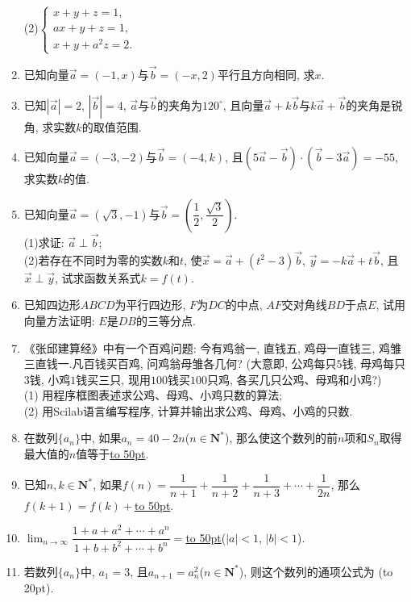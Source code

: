 \documentclass[10pt,a4paper]{article}
\newcommand{\blank}[1]{\underline{\hbox to #1pt{}}}
\newcommand{\bracket}[1]{(\hbox to #1pt{})}
\begin{document}
\begin{enumerate}[1.]
(2)$\begin{cases}x+y+z=1,  \\ax+y+z=1,  \\x+y+a^2z=2.  \end{cases}$
\item 已知向量$\overrightarrow a=(-1,x)$与$\overrightarrow b=(-x,2)$平行且方向相同, 求$x$.
\item 已知$|\overrightarrow a|=2$, $|\overrightarrow b|=4$, $\overrightarrow a$与$\overrightarrow b$的夹角为$120^{\circ }$, 且向量$\overrightarrow a+k\overrightarrow b$与$k\overrightarrow a+\overrightarrow b$的夹角是锐角, 求实数$k$的取值范围.
\item 已知向量$\overrightarrow a=(-3,-2)$与$\overrightarrow b=(-4,k)$, 且$(5\overrightarrow a-\overrightarrow b)\cdot (\overrightarrow b-3\overrightarrow a)=-55$, 求实数$k$的值.
\item 已知向量$\overrightarrow a=(\sqrt 3,-1)$与$\overrightarrow b=(\dfrac 12,\dfrac{\sqrt 3}2)$.\\
(1)求证: $\overrightarrow a\perp \overrightarrow b$;\\
(2)若存在不同时为零的实数$k$和$t$, 使$\overrightarrow x=\overrightarrow a+(t^2-3)\overrightarrow b$, $\overrightarrow y=-k\overrightarrow a+t\overrightarrow b$, 且$\overrightarrow x\perp \overrightarrow y$, 试求函数关系式$k=f(t)$.
\item 已知四边形$ABCD$为平行四边形, $F$为$DC$的中点, $AF$交对角线$BD$于点$E$, 试用向量方法证明: $E$是$DB$的三等分点.
\item 《张邱建算经》中有一个百鸡问题: 今有鸡翁一, 直钱五, 鸡母一直钱三, 鸡雏三直钱一.凡百钱买百鸡, 问鸡翁母雏各几何? (大意即, 公鸡每只$5$钱, 母鸡每只$3$钱, 小鸡$1$钱买三只, 现用$100$钱买$100$只鸡, 各买几只公鸡、母鸡和小鸡?)\\
(1) 用程序框图表述求公鸡、母鸡、小鸡只数的算法;\\
(2) 用Scilab语言编写程序, 计算并输出求公鸡、母鸡、小鸡的只数.
\item 在数列$\{a_n\}$中, 如果$a_n=40-2n$($n\in \mathbf{N}^*$), 那么使这个数列的前$n$项和$S_n$取得最大值的$n$值等于\blank{50}.
\item 已知$n,k\in \mathbf{N}^*$, 如果$f(n)=\dfrac 1{n+1}+\dfrac 1{n+2}+\dfrac 1{n+3}+\cdots +\dfrac 1{2n}$, 那么$f(k+1)=f(k)+$\blank{50}.
\item $\displaystyle\lim_{n\to\infty}\dfrac{1+a+a^2+\cdots +a^n}{1+b+b^2+\cdots +b^n}=$\blank{50}($|a|<1$, $|b|<1$).
\item 若数列$\{a_n\}$中, $a_1=3$, 且$a_{n+1}=a_n^2$($n\in \mathbf{N}^*$), 则这个数列的通项公式为    \bracket{20}.

\end{enumerate}
\end{document}
